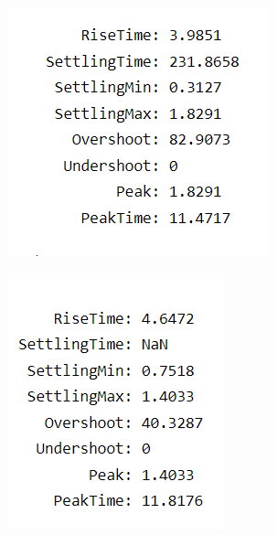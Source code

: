 \documentclass[12pt]{article}
\begin{document}
\begin{minipage}{0.45\linewidth}
  \begin{figure}[H]
    \centering
    \includegraphics[width=\linewidth]{images/plot2.png}
    \label{fig:plot_2}
  \end{figure}
\end{minipage}%
\hfill
\begin{minipage}{0.45\linewidth}
  \begin{figure}[H]
    \centering
    \includegraphics[width=\linewidth]{images/plot9.png}
    \label{fig:plot_9}
  \end{figure}  
\end{minipage}
\end{document}
